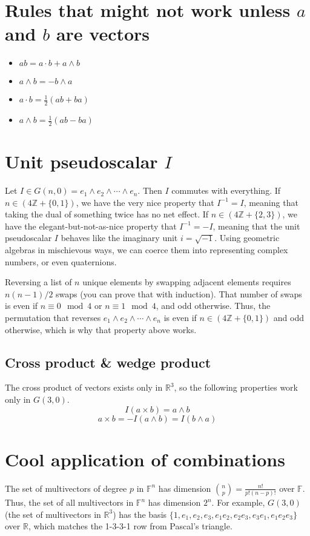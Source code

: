 \documentclass[12pt]{article}
\begin{document}
\section{Rules that might not work unless $a$ and $b$ are vectors}
\begin{itemize}
    \item $ab = a \cdot b + a \wedge b$
    \item $a \wedge b = - b \wedge a$
    \item $a \cdot b = \frac{1}{2}(ab + ba)$
    \item $a \wedge b = \frac{1}{2} (ab - ba)$
\end{itemize}

\section{Unit pseudoscalar $I$}
Let $I \in G(n, 0) = e_1 \wedge e_2 \wedge \cdots \wedge e_n$. Then $I$ commutes with everything. If $n \in (4 \mathbb{Z} + \{0, 1\})$, we have the very nice property that $I^{-1} = I$, meaning that taking the dual of something twice has no net effect. If $n \in (4 \mathbb{Z} + \{2, 3\})$, we have the elegant-but-not-as-nice property that $I^{-1} = -I$, meaning that the unit pseudoscalar $I$ behaves like the imaginary unit $i = \sqrt{-1}$. Using geometric algebras in mischievous ways, we can coerce them into representing complex numbers, or even quaternions.

Reversing a list of $n$ unique elements by swapping adjacent elements requires $n(n-1)/2$ swaps (you can prove that with induction). That number of swaps is even if $n \equiv 0 \mod{4}$ or $n \equiv 1 \mod{4}$, and odd otherwise. Thus, the permutation that reverses $e_1 \wedge e_2 \wedge \cdots \wedge e_n$ is even if $n \in (4 \mathbb{Z} + \{0, 1\})$ and odd otherwise, which is why that property above works.

\subsection{Cross product \& wedge product}
The cross product of vectors exists only in $\mathbb{R}^3$, so the following properties work only in $G(3, 0)$.
\[I (a \times b) = a \wedge b\]
\[a \times b = -I (a \wedge b) = I (b \wedge a)\]


\section{Cool application of combinations}
The set of multivectors of degree $p$ in $\mathbb{F}^n$ has dimension ${n \choose p} = \frac{n!}{p!(n-p)!} $ over $\mathbb{F}$. Thus, the set of all multivectors in $\mathbb{F}^n$ has dimension $2^n$. For example, $G(3,0)$ (the set of multivectors in $\mathbb{R}^3$) has the basis $\{1, e_1, e_2, e_3, e_1 e_2, e_2 e_3, e_3 e_1, e_1 e_2 e_3\}$ over $\mathbb{R}$, which matches the 1-3-3-1 row from Pascal's triangle.
\end{document}
